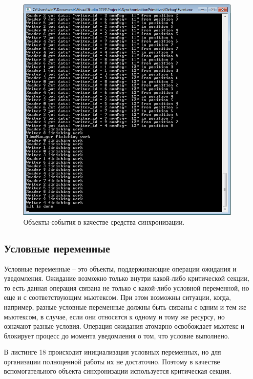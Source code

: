 \documentclass[a4paper, 12pt]{article}		%
\begin{document}
\begin{figure}[h!]
\centering
\includegraphics[scale=1]{res/004}
\caption{Объекты-события в качестве средства синхронизации.}
\end{figure}

\newpage
\subsection{Условные переменные}

Условные переменные -- это объекты, поддерживающие операции ожидания и уведомления. Ожидание возможно только внутри какой-либо критической секции, то есть данная операция связана не только с какой-либо условной переменной, но еще и с соответствующим мьютексом. При этом возможны ситуации, когда, например, разные условные переменные должны быть связаны с одним и тем же мьютексом, в случае, если они относятся к одному и тому же ресурсу, но означают разные условия. Операция ожидания атомарно освобождает мьютекс и блокирует процесс до момента уведомления о том, что условие выполнено\cite{MSDN1}.

В листинге 18 происходит инициализация условных переменных, но для организации полноценной работы их не достаточно. Поэтому в качестве вспомогательного объекта синхронизации используется критическая секция.
\end{document}
